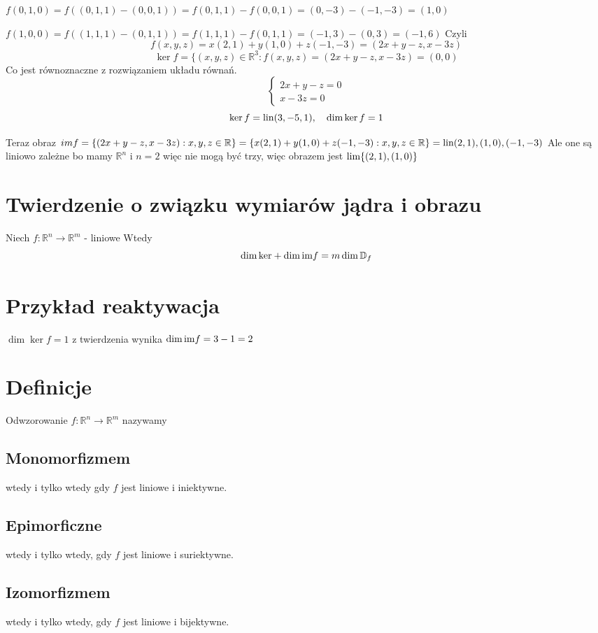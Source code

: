 \documentclass[11pt]{article}
\begin{document}
$f(0,1,0) = f((0,1,1) - (0,0,1)) = f(0,1,1) - f(0,0,1) = (0,-3) - (-1,-3) = (1,0)$

$f(1,0,0) = f((1,1,1) -(0,1,1)) = f(1,1,1) - f(0,1,1) = (-1,3) - (0,3) = (-1,6)$
Czyli
$$f(x,y,z) = x(2,1) + y(1,0) + z(-1,-3) = (2x+y-z,x-3z)$$
$$\ker{f} = \{(x,y,z) \in \mathbb{R}^3 : f(x,y,z) = (2x+y-z,x-3z) = (0,0)$$
Co jest równoznaczne z rozwiązaniem układu równań.
$$\begin{cases}
2x + y - z = 0 \\
x -3z = 0
\end{cases}$$
$$\ker{f} = \hbox{lin}{(3,-5,1)}, \quad \dim{\ker{f}} = 1$$

Teraz obraz
$im{f} = \{(2x + y -z, x - 3z) : x,y,z \in \mathbb{R}\} = \{x(2,1) + y(1,0) + z(-1,-3) : x,y,z \in \mathbb{R}\}= \hbox{lin}{(2,1),(1,0),(-1,-3)}$
Ale one są liniowo zależne bo mamy $\mathbb{R}^n$ i $n=2$ więc nie mogą być trzy, więc obrazem jest 
$\hbox{lim}\{(2,1),(1,0)\}$

\section{Twierdzenie o związku wymiarów jądra i obrazu}
Niech $f : \mathbb{R}^n \to \mathbb{R}^m$ - liniowe
Wtedy $$\dim{\ker} + \dim{\hbox{im}{f}} = m \dim{\mathbb{D}_f}$$
\section{Przykład reaktywacja}
$\dim{\ker{f}}= 1$ z twierdzenia wynika $\dim{\hbox{im}{f}} = 3 -1 = 2$

\section{Definicje}
Odwzorowanie $f: \mathbb{R}^n \to \mathbb{R}^m$ nazywamy
\subsection{Monomorfizmem}
wtedy i tylko wtedy gdy $f$ jest liniowe i iniektywne.
\subsection{Epimorficzne}
wtedy i tylko wtedy, gdy $f$ jest liniowe i suriektywne.
\subsection{Izomorfizmem}
wtedy i tylko wtedy, gdy $f$ jest liniowe i bijektywne.
\end{document}
